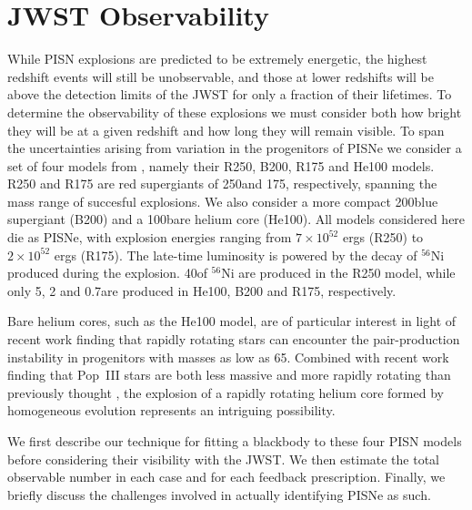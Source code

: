 \documentclass[../thesis.tex]{subfiles}
\begin{document}
\section{JWST Observability}
\label{JWSTobs}
While PISN explosions are predicted to be extremely energetic, the
highest redshift events will still be unobservable, and those at lower
redshifts will be above the detection limits of the JWST for only a
fraction of their lifetimes. To determine the observability of these
explosions we must consider both how bright they will be at a given
redshift and how long they will remain visible.  To span the
uncertainties arising from variation in the progenitors of PISNe we
consider a set of four models from \citet{KasenWoosleyHeger2011},
namely their R250, B200, R175 and He100 models.  R250 and R175 are red
supergiants of 250\msun and 175\msun, respectively, spanning the mass
range of succesful explosions.  We also consider a more compact
200\msun blue supergiant (B200) and a 100\msun bare helium core
(He100).  All models considered here die as PISNe, with explosion
energies ranging from $7\times10^{52}$ ergs (R250) to $2\times10^{52}$
ergs (R175).  The late-time luminosity is powered by the decay of
$^{56}$Ni produced during the explosion.  40\msun of $^{56}$Ni are
produced in the R250 model, while only 5, 2 and 0.7\msun are produced
in He100, B200 and R175, respectively.

Bare helium cores, such as the He100 model, are of particular interest
in light of recent work finding that rapidly rotating stars can
encounter the pair-production instability in progenitors with masses
as low as 65\msun \citep{ChatzopoulosWheeler2012,
  YoonDierksLanger2012}. Combined with recent work finding that
Pop~III stars are both less massive and more rapidly rotating than
previously thought \citep{StacyGreifBromm2010, StacyBrommLoeb2011b,
  StacyGreifBromm2012, Clarketal2011b, Greifetal2011, Greifetal2012},
the explosion of a rapidly rotating helium core formed by homogeneous
evolution represents an intriguing possibility.

We first describe our technique for fitting a blackbody to these four
PISN models before considering their visibility with the JWST. We then
estimate the total observable number in each case and for each
feedback prescription.  Finally, we briefly discuss the challenges
involved in actually identifying PISNe as such.
\end{document}
